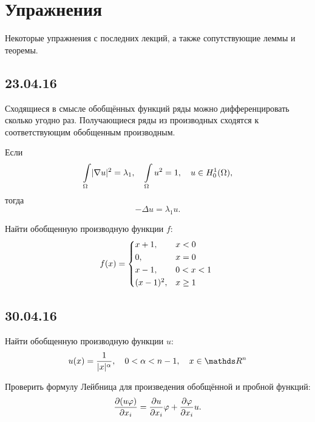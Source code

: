 \chapter{Упражнения}
Некоторые упражнения с последних лекций, а также сопутствующие леммы и теоремы.
\section*{23.04.16}
\begin{lemma}
Сходящиеся в смысле обобщённых функций ряды можно дифференцировать сколько угодно раз. Получающиеся ряды из производных сходятся к соответствующим обобщенным производным.
\end{lemma}

\begin{exercise}
Если $$\int \limits_{\Omega} \abs{\nabla u}^2 = \lambda_1, \quad \int \limits_{\Omega} u^2 = 1, \quad u \in H_0^1(\Omega),$$
тогда $$ - \Delta u = \lambda_1 u.$$
\end{exercise}

\begin{exercise}
Найти обобщенную производную функции $f$:
\begin{gather*}
f(x) =
	\begin{cases*}
		x+1, & $x < 0$ \\
		0, & $x = 0$ \\
		x-1, & $0 < x < 1$ \\
		(x-1)^2, & $x \geq 1$
	\end{cases*}
\end{gather*}
\end{exercise}

\section*{30.04.16}
\begin{exercise}
Найти обобщенную производную функции $u$:
$$u(x) = \frac {1} {\abs{x}^{\alpha}}, \quad 0 < \alpha < n -1, \quad x \in \real^n$$
\end{exercise}

\begin{exercise}
Проверить формулу Лейбница для произведения обобщённой и пробной функций:
$$\pder[(u \varphi)]{x_i} = \pder[u]{x_i} \varphi + \pder[\varphi]{x_i} u.$$
\end{exercise}

